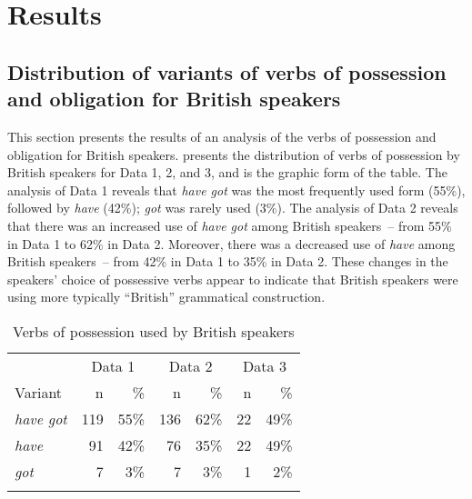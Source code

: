 \documentclass[output=paper,colorlinks,citecolor=brown]{langscibook}
\begin{document}
\section{Results} \label{sec:hirano:5}
\subsection{Distribution of variants of verbs of possession and obligation for British speakers} %
\label{sec:hirano:5.1}
\largerpage[2]

This section presents the results of an analysis of the verbs of possession and obligation for British speakers.  presents the distribution of verbs of possession by British speakers for Data 1, 2, and 3, and  is the graphic form of the table. The analysis of Data 1 reveals that \textit{have got} was the most frequently used form (55\%), followed by \textit{have} (42\%); \textit{got} was rarely used (3\%). The analysis of Data 2 reveals that there was an increased use of \textit{have got} among British speakers~– from 55\% in Data 1 to 62\% in Data 2. Moreover, there was a decreased use of \textit{have} among British speakers~– from 42\% in Data 1 to 35\% in Data 2. These changes in the speakers’ choice of possessive verbs appear to indicate that British speakers were using more typically “British” grammatical construction.

\begin{table}
\begin{tabularx}{.66\textwidth}{Xrrrrrr}
\lsptoprule
 & \multicolumn{2}{c}{{{Data} {1}}} & \multicolumn{2}{c}{{{Data} {2}}} & \multicolumn{2}{c}{{{Data} {3}}}\\
\cmidrule(lr){2-3}
\cmidrule(lr){4-5}
\cmidrule(lr){6-7}
Variant &  n &  \% &  n &  \% &  n &  \%\\
\midrule
\textit{have got} &  119 &  55\% &  136 &  62\% &  22 &  49\%\\
\textit{have} &  91 &  42\% &  76 &  35\% &  22 &  49\%\\
\textit{got} &  7 &  3\% &  7 &  3\% &  1 &  2\%\\
\lspbottomrule
\end{tabularx}
\caption{Verbs of possession used by British speakers}
\label{tab:hirano:3}
\end{table}
\end{document}
